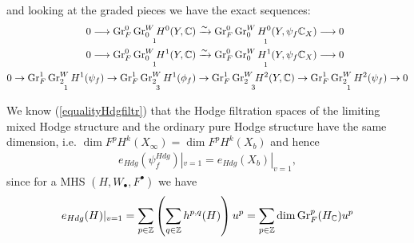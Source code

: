 \documentclass[../main.tex]{subfiles}
\begin{document}
\begin{es}

and looking at the graded pieces we have the exact sequences:
\begin{align*}
    0 \longrightarrow \underset{\text{1}}{\operatorname{Gr}^0_F \operatorname{Gr}^{W}_{0} H^0(Y, \mathbb{C})} &\xrightarrow{\sim} \underset{\text{1}}{\operatorname{Gr}^0_F \operatorname{Gr}^{W}_{0} H^0(Y,  \psi_f \mathbb{C}_X)} \longrightarrow 0 \\
    0 \longrightarrow \underset{\text{1}}{\operatorname{Gr}^0_F \operatorname{Gr}^{W}_{0} H^1(Y, \mathbb{C})} &\xrightarrow{\sim} \underset{\text{1}}{\operatorname{Gr}^0_F \operatorname{Gr}^{W}_{0} H^1(Y,  \psi_f \mathbb{C}_X)} \longrightarrow 0 \\
    0 \to \underset{\text{1}}{\operatorname{Gr}^1_F \operatorname{Gr}^{W}_{2} H^1( \psi_f)} \to \underset{\text{3}}{\operatorname{Gr}^1_F \operatorname{Gr}^{W}_{2} H^1( \phi_f)} &\to \underset{\text{3}}{\operatorname{Gr}^1_F \operatorname{Gr}^{W}_{2} H^2(Y, \mathbb{C})} \to \underset{\text{1}}{\operatorname{Gr}^1_F \operatorname{Gr}^{W}_{2} H^2( \psi_f )} \to 0
\end{align*}

\end{es}

We know (\ref{equalityHdgfiltr}) that the Hodge filtration spaces of the limiting mixed Hodge structure and the ordinary pure Hodge structure have the same dimension, i.e. $\dim F^pH^k(X_{\infty}) =  \dim F^pH^k(X_{b}) $ and hence
\begin{align} \label{relationHdgpol}
    e_{Hdg}(\psi_f^{Hdg} )|_{v=1}=  e_{Hdg}(X_b )|_{v=1},
\end{align}
since for a MHS $(H,W_\bullet,F^\bullet)$ we have
\[
e_{Hdg}(H)|_{v=1} = \sum_{p \in \mathbb{Z}} \left( \sum_{q \in \mathbb{Z}} h^{p,q} (H) \right) u^p = \sum_{p \in \mathbb{Z}} \dim \operatorname{Gr}_F^p(H_{\mathbb{C}})  u^p
\]
\end{document}

